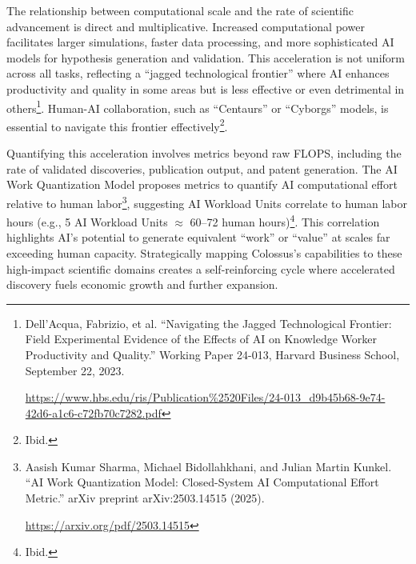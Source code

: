 \documentclass[fontsize=10pt, oneside, DIV=calc]{scrartcl}
\begin{document}
\medskip

\noindent
The relationship between computational scale and the rate of scientific advancement is direct and multiplicative. Increased computational power facilitates larger simulations, faster data processing, and more sophisticated AI models for hypothesis generation and validation. This acceleration is not uniform across all tasks, reflecting a ``jagged technological frontier'' where AI enhances productivity and quality in some areas but is less effective or even detrimental in others\footnote{Dell’Acqua, Fabrizio, et al. ``Navigating the Jagged Technological Frontier: Field Experimental Evidence of the Effects of AI on Knowledge Worker Productivity and Quality.'' Working Paper 24-013, Harvard Business School, September 22, 2023. 







\href{https://www.hbs.edu/ris/Publication\%2520Files/24-013\_d9b45b68-9e74-42d6-a1c6-c72fb70c7282.pdf}\url{https://www.hbs.edu/ris/Publication\%2520Files/24-013\_d9b45b68-9e74-42d6-a1c6-c72fb70c7282.pdf}}. Human-AI collaboration, such as ``Centaurs'' or ``Cyborgs'' models, is essential to navigate this frontier effectively\footnote{Ibid.}.

\medskip

\noindent
Quantifying this acceleration involves metrics beyond raw FLOPS, including the rate of validated discoveries, publication output, and patent generation. The AI Work Quantization Model proposes metrics to quantify AI computational effort relative to human labor\footnote{Aasish Kumar Sharma, Michael Bidollahkhani, and Julian Martin Kunkel. ``AI Work Quantization Model: Closed-System AI Computational Effort Metric.'' arXiv preprint arXiv:2503.14515 (2025). 







\href{https://arxiv.org/pdf/2503.14515}\url{https://arxiv.org/pdf/2503.14515}}, suggesting AI Workload Units correlate to human labor hours (e.g., 5 AI Workload Units $\approx$ 60--72 human hours)\footnote{Ibid.}. This correlation highlights AI's potential to generate equivalent ``work'' or ``value'' at scales far exceeding human capacity. Strategically mapping Colossus's capabilities to these high-impact scientific domains creates a self-reinforcing cycle where accelerated discovery fuels economic growth and further expansion.
\end{document}
